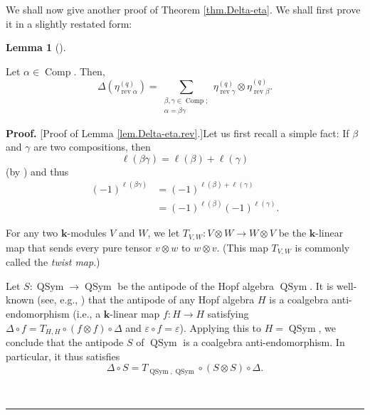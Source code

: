 \documentclass[numbers=enddot,12pt,final,onecolumn,notitlepage]{scrartcl}%
\theoremstyle{definition}
\newtheorem{lem}[theo]{Lemma}
\newenvironment{lemma}[1][]
{\begin{lem}[#1]\begin{leftbar}}
{\end{leftbar}\end{lem}}
\newenvironment{proof}[1][Proof]{\noindent\textbf{#1.} }{\ \rule{0.5em}{0.5em}}
\let\sumnonlimits\sum
\renewcommand{\sum}{\sumnonlimits\limits}
\newenvironment{verlong}{}{}
\begin{document}
\begin{verlong}
We shall now give another proof of Theorem \ref{thm.Delta-eta}. We shall first
prove it in a slightly restated form:

\begin{lemma}
\label{lem.Delta-eta.rev}Let $\alpha\in\operatorname*{Comp}$. Then,%
\[
\Delta\left(  \eta_{\operatorname*{rev}\alpha}^{\left(  q\right)  }\right)
=\sum_{\substack{\beta,\gamma\in\operatorname*{Comp};\\\alpha=\beta\gamma
}}\eta_{\operatorname*{rev}\gamma}^{\left(  q\right)  }\otimes\eta
_{\operatorname*{rev}\beta}^{\left(  q\right)  }.
\]

\end{lemma}

\begin{proof}
[Proof of Lemma \ref{lem.Delta-eta.rev}.]Let us first recall a simple fact: If
$\beta$ and $\gamma$ are two compositions, then%
\[
\ell\left(  \beta\gamma\right)  =\ell\left(  \beta\right)  +\ell\left(
\gamma\right)
\]
(by \cite[Proposition 5.2 \textbf{(a)}]{comps}) and thus%
\begin{align}
\left(  -1\right)  ^{\ell\left(  \beta\gamma\right)  }  &  =\left(  -1\right)
^{\ell\left(  \beta\right)  +\ell\left(  \gamma\right)  }\nonumber\\
&  =\left(  -1\right)  ^{\ell\left(  \beta\right)  }\left(  -1\right)
^{\ell\left(  \gamma\right)  }. \label{pf.lem.Delta-eta.rev.-1l}%
\end{align}


For any two $\mathbf{k}$-modules $V$ and $W$, we let $T_{V,W}:V\otimes
W\rightarrow W\otimes V$ be the $\mathbf{k}$-linear map that sends every pure
tensor $v\otimes w$ to $w\otimes v$. (This map $T_{V,W}$ is commonly called
the \emph{twist map}.)

Let $S:\operatorname*{QSym}\rightarrow\operatorname*{QSym}$ be the antipode of
the Hopf algebra $\operatorname*{QSym}$. It is well-known (see, e.g.,
\cite[Exercise 1.4.28]{GriRei}) that the antipode of any Hopf algebra $H$ is a
coalgebra anti-endomorphism (i.e., a $\mathbf{k}$-linear map $f:H\rightarrow
H$ satisfying $\Delta\circ f=T_{H,H}\circ\left(  f\otimes f\right)
\circ\Delta$ and $\varepsilon\circ f=\varepsilon$). Applying this to
$H=\operatorname*{QSym}$, we conclude that the antipode $S$ of
$\operatorname*{QSym}$ is a coalgebra anti-endomorphism. In particular, it
thus satisfies
\[
\Delta\circ S=T_{\operatorname*{QSym},\operatorname*{QSym}}\circ\left(
S\otimes S\right)  \circ\Delta.
\]



\end{proof}
\end{verlong}
\end{document}
